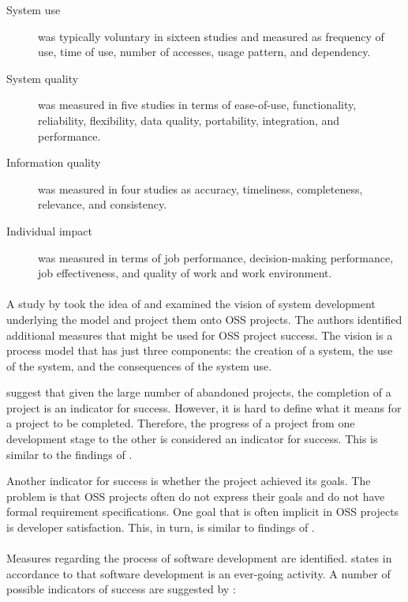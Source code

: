 \begin{description}
	\item[System use] was typically voluntary in sixteen studies and measured as
		frequency of use, time of use, number of accesses, usage pattern, and
		dependency.

	\item[System quality] was measured in five studies in terms of ease-of-use,
		functionality, reliability, flexibility, data quality, portability,
		integration, and performance.

	\item[Information quality] was measured in four studies as accuracy,
		timeliness, completeness, relevance, and consistency.

	\item[Individual impact] was measured in terms of job performance,
		decision-making performance, job effectiveness, and quality of work and work
		environment.
\end{description}

\paragraph{}
A study by \citet{crowston2003} took the idea of \citeauthor{delone2003}
\cite{delone1992, delone2003} and examined the vision of system development
underlying the model and project them onto OSS projects. The authors identified
additional measures that might be used for OSS project success. The vision is a
process model that has just three components: the creation of a system, the use
of the system, and the consequences of the system use.

\citet{crowston2003} suggest that given the large number of abandoned projects,
the completion of a project is an indicator for success. However, it is hard to
define what it means for a project to be completed. Therefore, the progress of
a project from one development stage to the other is considered an indicator for
success. This is similar to the findings of \citet{androutsellis}.

Another indicator for success is whether the project achieved its goals. The
problem is that OSS projects often do not express their goals and do not have
formal requirement specifications. One goal that is often implicit in OSS
projects is developer satisfaction. This, in turn, is similar to findings of
\citet{androutsellis}.

\paragraph{}
Measures regarding the process of software development are identified.
\citet{crowston2003} states in accordance to \citet{lehman} that
software development is an ever-going activity. A number of possible indicators
of success are suggested by \citet{crowston2003}:

